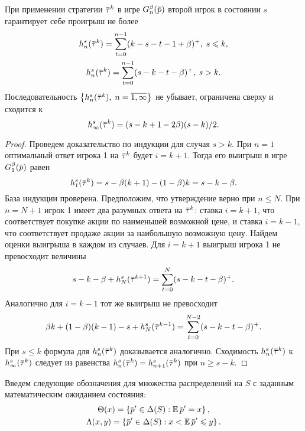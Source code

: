 {\begin{lemma}
  \label{ch3:upper-bound:lemma:vector-payoffs}
  При применении стратегии $\tauv^k$ в игре $\theG(\p)$ второй игрок в состоянии $s$ гарантирует себе проигрыш не более
  \begin{gather*}
    h^s_n(\tauv^k) = \sum_{t=0}^{n-1} (k-s-t-1+\beta)^+, \; s \leqslant k, \\
    h^s_n(\tauv^k) = \sum_{t=0}^{n-1} (s-k-t-\beta)^+, \; s > k.
  \end{gather*}
  Последовательность $\left\{ h^s_n(\tauv^k), \; n = \overline{1, \infty}
  \right\}$ не убывает, ограничена сверху и сходится к %
  \begin{equation}
    \label{upper-bound:eq:max-payoff}
    h^s_\infty(\tauv^k) = (s - k + 1 - 2\beta)(s-k)/2.
  \end{equation}
\end{lemma}
\begin{proof}
  Проведем доказательство по индукции для случая $s > k$.
  При $n = 1$ оптимальный ответ игрока 1 на $\tauv^k$ будет $i = k + 1$.
  Тогда его выигрыш в игре $\theG[1](\p)$ равен
  \begin{equation*}
    h^s_1(\tauv^k) = s - \beta(k+1) - (1-\beta)k = s - k - \beta.
  \end{equation*}
  База индукции проверена.
  Предположим, что утверждение верно при $n \leqslant N$.
  При $n = N + 1$ игрок 1 имеет два разумных ответа на $\tauv^k$: ставка $i = k + 1$, что соответствует покупке акции по наименьшей возможной цене, и ставка $i = k - 1$, что соответствует продаже акции за наибольшую возможную цену.
  Найдем оценки выигрыша в каждом из случаев.
  Для $i = k + 1$ выигрыш игрока 1 не превосходит величины
  \begin{equation*}
    s - k - \beta + h^s_N(\tauv^{k+1}) = \sum_{t=0}^N(s-k-t-\beta)^+.
  \end{equation*}
  Аналогично для $i = k - 1$ тот же выигрыш не превосходит
  \begin{equation*}
    \beta k + (1-\beta)(k-1) - s + h^s_N(\tauv^{k-1}) = \sum_{t=0}^{N-2}(s-k-t-\beta)^+.
  \end{equation*}
  При $s \leqslant k$ формула для $h^s_n(\tauv^k)$ доказывается аналогично.
  Сходимость $h^s_n(\tauv^k)$ к $h^s_\infty(\tauv^k)$ следует из равенства $h^s_n(\tauv^k) = h^s_{n+1}(\tauv^k)$ при $n \geqslant s - k$.
\end{proof}

Введем следующие обозначения для множества распределений на $S$ с заданным математическим ожиданием состояния:
\begin{gather*}
  \Theta(x) = \left\{ \p' \in \Delta(S): \E \p' = x \right\},\\
  \Lambda(x, y) = \left\{ \p' \in \Delta(S): x < \E \p' \leqslant y \right\}.
\end{gather*}

}
